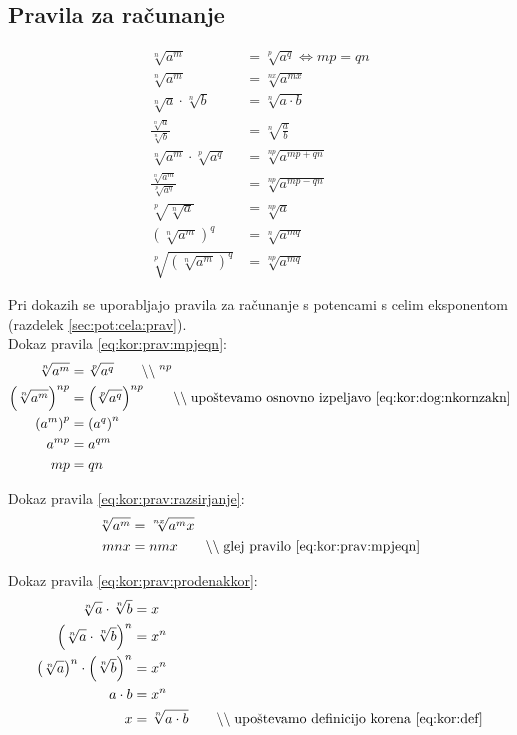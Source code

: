 \documentclass[a4paper,oneside,12pt,fleqn]{article}
\newcommand\krat\cdot
\newcommand{\comment}[1]{\ensuremath{\qquad\backslash\backslash\;}\textnormal{#1}}
\renewcommand\iff\Leftrightarrow
\numberwithin{equation}{section}
\begin{document}
\subsection{Pravila za računanje}
\label{sec:kor:prav}
\begin{align}
  \sqrt[n]{a^m} &= \sqrt[p]{a^q} \iff mp = qn \label{eq:kor:prav:mpjeqn} \\
  \sqrt[n]{a^m} &= \sqrt[nx]{a^{mx}} \label{eq:kor:prav:razsirjanje} \\ 
  \sqrt[n]{a} \krat \sqrt[n]{b} &= \sqrt[n]{a \krat b} \label{eq:kor:prav:prodenakkor} \\
  \frac{\sqrt[n]{a}}{\sqrt[n]{b}} &= \sqrt[n]{\frac{a}{b}} \label{eq:kor:prav:ulenakkor} \\
  \sqrt[n]{a^m} \krat \sqrt[p]{a^q} &= \sqrt[np]{a^{mp+qn}} \label{eq:kor:prav:prodkor} \\
  \frac{\sqrt[n]{a^m}}{\sqrt[p]{a^q}} &= \sqrt[np]{a^{mp-qn}} \label{eq:kor:prav:kvockor} \\
  \sqrt[p]{\sqrt[n]{a}} &= \sqrt[np]{a} \label{eq:kor:prav:korkor} \\
  \left( \sqrt[n]{a^m} \right)^q &= \sqrt[n]{a^{mq}}  \label{eq:kor:prav:koranannaq} \\
  \sqrt[p]{\left( \sqrt[n]{a^m} \right)^q} &= \sqrt[np]{a^{mq}} \label{eq:kor:prav:korkoranannaq}
\end{align}

Pri dokazih se uporabljajo pravila za računanje s potencami s celim eksponentom (razdelek
\ref{sec:pot:cela:prav}).\\[5pt]
Dokaz pravila \ref{eq:kor:prav:mpjeqn}:
\begin{align*}
  \sqrt[n]{a^m} &= \sqrt[p]{a^q} \comment{$^{np}$} \\
  \left(\sqrt[n]{a^m}\right)^{np} &= \left(\sqrt[p]{a^q} \right)^{np} \comment{upoštevamo
  osnovno izpeljavo \eqref{eq:kor:dog:nkornzakn}} \\
  \left( a^m \right)^p &= \left( a^q \right)^n \\
  a^{mp} &= a^{qm} \\
  mp &= qn
\end{align*}

Dokaz pravila \ref{eq:kor:prav:razsirjanje}:
\begin{align*}
  \sqrt[n]{a^m} &= \sqrt[nx]{a^mx} \\
  mnx &= nmx \comment{glej pravilo \eqref{eq:kor:prav:mpjeqn}}
\end{align*}

Dokaz pravila \ref{eq:kor:prav:prodenakkor}:
\begin{align*}
  \sqrt[n]{a} \krat \sqrt[n]{b} &= x \\
  \left( \sqrt[n]{a} \krat \sqrt[n]{b} \right)^n &= x^n \\
  \left(\sqrt[n]{a}\right)^n \krat \left(\sqrt[n]{b} \right)^n &= x^n \\
  a \krat b &= x^n \\
  x &= \sqrt[n]{a\krat b} \comment{upoštevamo definicijo korena \eqref{eq:kor:def}}
\end{align*}
\end{document}
